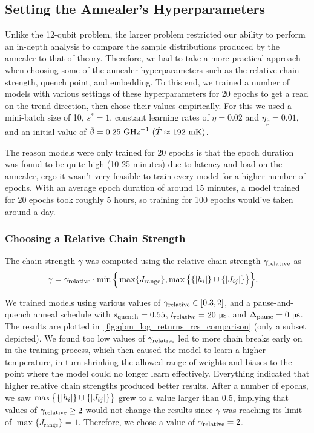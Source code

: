 \subsection{Setting the Annealer's Hyperparameters}\label{sec:qbm_hyperparameters}
Unlike the 12-qubit problem, the larger problem restricted our ability to perform an in-depth analysis to compare the sample distributions produced by the annealer to that of theory.
Therefore, we had to take a more practical approach when choosing some of the annealer hyperparameters such as the relative chain strength, quench point, and embedding.
To this end, we trained a number of models with various settings of these hyperparameters for 20 epochs to get a read on the trend direction, then chose their values empirically.
For this we used a mini-batch size of 10, \( s^* = 1 \), constant learning rates of \( \eta = 0.02 \) and \( \eta_{\hat{\beta}} = 0.01 \), and an initial value of \( \betahat = 0.25 \ \si{\giga\hertz}^{-1} \ (\hat{T} \approx 192 \ \si{\milli\kelvin}) \).

The reason models were only trained for 20 epochs is that the epoch duration was found to be quite high (10-25 minutes) due to latency and load on the annealer, ergo it wasn't very feasible to train every model for a higher number of epochs.
With an average epoch duration of around 15 minutes, a model trained for 20 epochs took roughly 5 hours, so training for 100 epochs would've taken around a day.

\subsubsection{Choosing a Relative Chain Strength}\label{sec:qbm_rcs}
The chain strength \( \gamma \) was computed using the relative chain strength \( \gamma_{\text{relative}} \) as
\begin{align}
    \gamma
        &= \gamma_{\text{relative}} \cdot \min\Big\{
            \max\{J_\text{range}\}, \max\big\{\{\lvert h_i\rvert\} \cup \{\lvert J_{ij}\rvert\}\big\}
        \Big\}.
\end{align}

We trained models using various values of \( \gamma_{\text{relative}} \in [0.3, 2] \), and a pause-and-quench anneal schedule with \( s_{\text{quench}} = 0.55 \), \( t_{\text{relative}} = 20 \ \si{\micro\second} \), and \( \Deltapause = 0 \ \si{\micro\second} \).
The results are plotted in~\cref{fig:qbm_log_returns_rcs_comparison} (only a subset depicted).
We found too low values of \( \gamma_{\text{relative}} \) led to more chain breaks early on in the training process, which then caused the model to learn a higher temperature, in turn shrinking the allowed range of weights and biases to the point where the model could no longer learn effectively.
Everything indicated that higher relative chain strengths produced better results.
After a number of epochs, we saw \( \max\big\{ \{\lvert h_i\rvert\} \cup \{\lvert J_{ij}\rvert\} \big\} \) grew to a value larger than 0.5, implying that values of \( \gamma_{\text{relative}} \ge 2 \) would not change the results since \( \gamma \) was reaching its limit of \( \max\{J_\text{range}\} = 1 \).
Therefore, we chose a value of \( \gamma_{\text{relative}} = 2 \).

